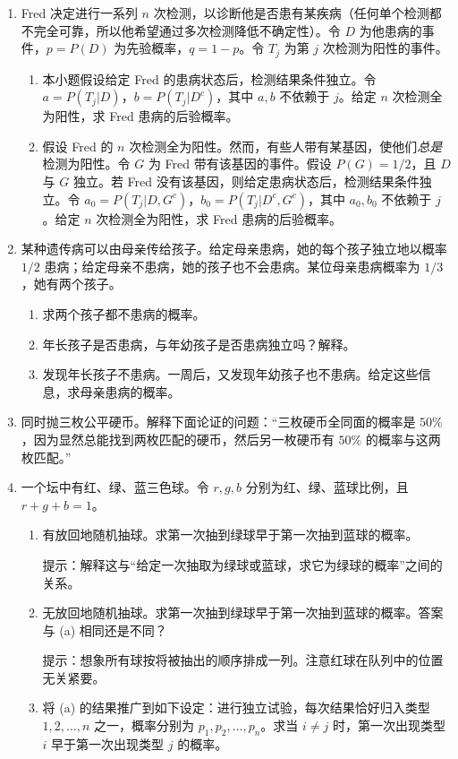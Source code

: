 \documentclass[UTF8,12pt,a4paper,fontset=fandol]{ctexart}
\begin{document}
\begin{enumerate}
  \item Fred 决定进行一系列 $n$ 次检测，以诊断他是否患有某疾病（任何单个检测都不完全可靠，所以他希望通过多次检测降低不确定性）。令 $D$ 为他患病的事件，$p=P(D)$ 为先验概率，$q=1-p$。令 $T_j$ 为第 $j$ 次检测为阳性的事件。
  \begin{enumerate}
    \item 本小题假设给定 Fred 的患病状态后，检测结果条件独立。令 $a=P(T_j|D)$，$b=P(T_j|D^c)$，其中 $a,b$ 不依赖于 $j$。给定 $n$ 次检测全为阳性，求 Fred 患病的后验概率。
    \item 假设 Fred 的 $n$ 次检测全为阳性。然而，有些人带有某基因，使他们\textit{总是}检测为阳性。令 $G$ 为 Fred 带有该基因的事件。假设 $P(G)=1/2$，且 $D$ 与 $G$ 独立。若 Fred 没有该基因，则给定患病状态后，检测结果条件独立。令 $a_0=P(T_j|D,G^c)$，$b_0=P(T_j|D^c,G^c)$，其中 $a_0,b_0$ 不依赖于 $j$。给定 $n$ 次检测全为阳性，求 Fred 患病的后验概率。
  \end{enumerate}

  \item 某种遗传病可以由母亲传给孩子。给定母亲患病，她的每个孩子独立地以概率 $1/2$ 患病；给定母亲不患病，她的孩子也不会患病。某位母亲患病概率为 $1/3$，她有两个孩子。
  \begin{enumerate}
    \item 求两个孩子都不患病的概率。
    \item 年长孩子是否患病，与年幼孩子是否患病独立吗？解释。
    \item 发现年长孩子不患病。一周后，又发现年幼孩子也不患病。给定这些信息，求母亲患病的概率。
  \end{enumerate}

  \item 同时抛三枚公平硬币。解释下面论证的问题：“三枚硬币全同面的概率是 $50\%$，因为显然总能找到两枚匹配的硬币，然后另一枚硬币有 $50\%$ 的概率与这两枚匹配。”

  \item 一个坛中有红、绿、蓝三色球。令 $r,g,b$ 分别为红、绿、蓝球比例，且 $r+g+b=1$。
  \begin{enumerate}
    \item 有放回地随机抽球。求第一次抽到绿球早于第一次抽到蓝球的概率。

    提示：解释这与“给定一次抽取为绿球或蓝球，求它为绿球的概率”之间的关系。
    \item 无放回地随机抽球。求第一次抽到绿球早于第一次抽到蓝球的概率。答案与 (a) 相同还是不同？

    提示：想象所有球按将被抽出的顺序排成一列。注意红球在队列中的位置无关紧要。
    \item 将 (a) 的结果推广到如下设定：进行独立试验，每次结果恰好归入类型 $1,2,\ldots,n$ 之一，概率分别为 $p_1,p_2,\ldots,p_n$。求当 $i\ne j$ 时，第一次出现类型 $i$ 早于第一次出现类型 $j$ 的概率。
  \end{enumerate}


\end{enumerate}
\end{document}
